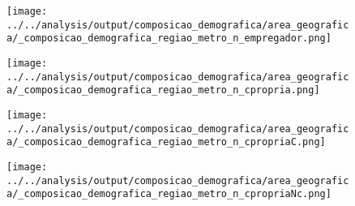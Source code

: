 \begin{frame}[label=_composicao_demografica_regiao_metro_n_empregador]{}
\textit{\hyperlink{_composicao_demografica_regiao_metro}{}}
\begin{figure}
  \centering
  \texttt{[image: ../../analysis/output/composicao\_demografica/area\_geografica/\_composicao\_demografica\_regiao\_metro\_n\_empregador.png]}
  \caption{}
  \label{fig:_composicao_demografica_regiao_metro_n_empregador}
\end{figure}
\end{frame}



\begin{frame}[label=_composicao_demografica_regiao_metro_n_cpropria]{}
\textit{\hyperlink{_composicao_demografica_regiao_metro}{}}
\begin{figure}
  \centering
  \texttt{[image: ../../analysis/output/composicao\_demografica/area\_geografica/\_composicao\_demografica\_regiao\_metro\_n\_cpropria.png]}
  \caption{}
  \label{fig:_composicao_demografica_regiao_metro_n_cpropria}
\end{figure}
\end{frame}

\begin{frame}[label=_composicao_demografica_regiao_metro_n_cpropriaC]{}
\textit{\hyperlink{_composicao_demografica_regiao_metro}{}}
\begin{figure}
  \centering
  \texttt{[image: ../../analysis/output/composicao\_demografica/area\_geografica/\_composicao\_demografica\_regiao\_metro\_n\_cpropriaC.png]}
  \caption{}
  \label{fig:_composicao_demografica_regiao_metro_n_cpropriaC}
\end{figure}
\end{frame}

\begin{frame}[label=_composicao_demografica_regiao_metro_n_cpropriaNc]{}
\textit{\hyperlink{_composicao_demografica_regiao_metro}{}}
\begin{figure}
  \centering
  \texttt{[image: ../../analysis/output/composicao\_demografica/area\_geografica/\_composicao\_demografica\_regiao\_metro\_n\_cpropriaNc.png]}
  \caption{}
  \label{fig:_composicao_demografica_regiao_metro_n_cpropriaNc}
\end{figure}
\end{frame}
